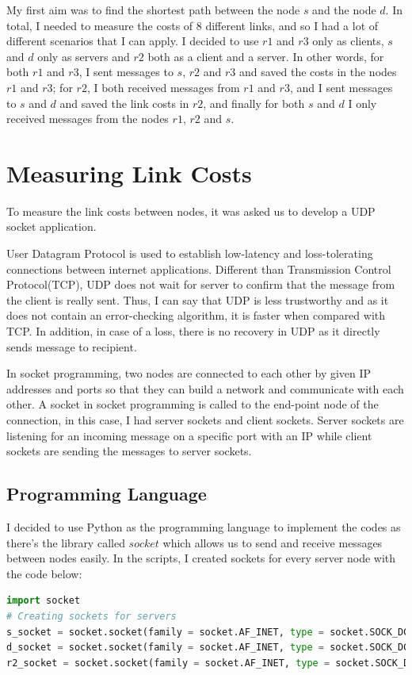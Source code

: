 \documentclass[conference]{IEEEtran}
\begin{document}
My first aim was to find the shortest path between the node $s$ and the node $d$. In total, I needed to measure the costs of $8$ different links, and so I had a lot of different scenarios that I can apply. I decided to use $r1$ and $r3$ only as clients, $s$ and $d$ only as servers and $r2$ both as a client and a server. In other words, for both $r1$ and $r3$, I sent messages to $s$, $r2$ and $r3$ and saved the costs in the nodes $r1$ and $r3$; for $r2$, I both received messages from $r1$ and $r3$, and I sent messages to $s$ and $d$ and saved the link costs in $r2$, and finally for both $s$ and $d$ I only received messages from the nodes $r1$, $r2$ and $s$.

\section{Measuring Link Costs}
To measure the link costs between nodes, it was asked us to develop a UDP socket application. 

User Datagram Protocol is used to establish low-latency and loss-tolerating connections between internet applications. Different than Transmission Control Protocol(TCP), UDP does not wait for server to confirm that the message from the client is really sent. Thus, I can say that UDP is less trustworthy and as it does not contain an error-checking algorithm, it is faster when compared with TCP. In addition, in case of a loss, there is no recovery in UDP as it directly sends message to recipient.

In socket programming, two nodes are connected to each other by given IP addresses and ports so that they can build a network and communicate with each other. A socket in socket programming is called to the end-point node of the connection, in this case, I had server sockets and client sockets. Server sockets are listening for an incoming message on a specific port with an IP while client sockets are sending the messages to server sockets.

\subsection{Programming Language}
I decided to use Python as the programming language to implement the codes as there's the library called $socket$ which allows us to send and receive messages between nodes easily. In the scripts, I created sockets for every server node with the code below:
\begin{lstlisting}[language=Python, caption=Creating sockets in Python]
import socket
# Creating sockets for servers
s_socket = socket.socket(family = socket.AF_INET, type = socket.SOCK_DGRAM)
d_socket = socket.socket(family = socket.AF_INET, type = socket.SOCK_DGRAM)
r2_socket = socket.socket(family = socket.AF_INET, type = socket.SOCK_DGRAM)
\end{lstlisting}
\end{document}
